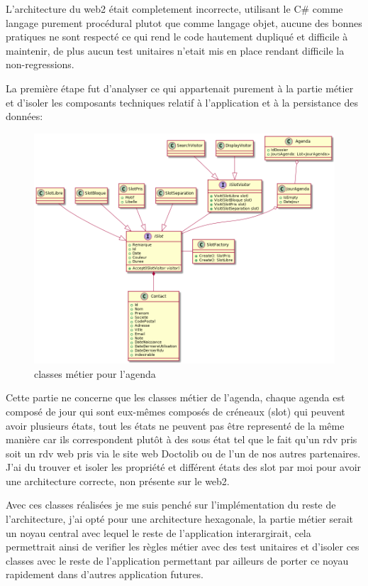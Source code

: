 L'architecture du web2 était completement incorrecte, utilisant le C\# comme langage purement procédural plutot que 
comme langage objet, aucune des bonnes pratiques ne sont respecté ce qui rend le code hautement dupliqué 
et difficile à maintenir, de plus aucun test unitaires n'etait mis en place rendant difficile la non-regressions.

La première étape fut d'analyser ce qui appartenait purement à la partie métier et d'isoler les composants 
techniques relatif à l'application et à la persistance des données: \newline

\begin{figure}[h]
	\centering
	\includegraphics[width=1\linewidth]{Images/slotmodelold}
	\caption{classes métier pour l'agenda}
	\label{fig:domainagenda}
\end{figure}

Cette partie ne concerne que les classes métier de l'agenda, chaque agenda est composé de jour 
qui sont eux-mêmes composés de créneaux (slot) qui peuvent avoir plusieurs états, tout les 
états ne peuvent pas être representé de la même manière car ils correspondent plutôt à 
des sous état tel que le fait qu'un rdv pris soit un rdv web pris via le site web Doctolib 
ou de l'un de nos autres partenaires. 
J'ai du trouver et isoler les propriété et différent états des slot par moi pour avoir une 
architecture correcte, non présente sur le web2.  \newline \newpage

Avec ces classes réalisées je me suis penché sur l'implémentation du reste de l'architecture, 
j'ai opté pour une architecture hexagonale, la partie métier serait un noyau central avec 
lequel le reste de l'application interargirait, cela permettrait ainsi de 
verifier les règles métier avec des test unitaires et d'isoler ces classes avec le reste 
de l'application permettant par ailleurs de porter ce noyau rapidement dans 
d'autres application futures. \newline

